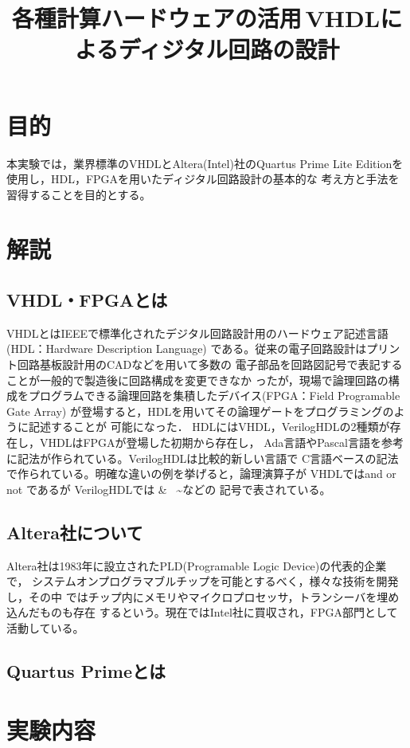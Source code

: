 \documentclass{ltjsarticle}
\title{各種計算ハードウェアの活用\,VHDLによるディジタル回路の設計}
\begin{document}
\maketitle

\section{目的}
本実験では，業界標準のVHDLとAltera(Intel)社のQuartus Prime Lite
Editionを使用し，HDL，FPGAを用いたディジタル回路設計の基本的な
考え方と手法を習得することを目的とする。
\section{解説}
	\subsection{VHDL・FPGAとは}
	VHDLとはIEEEで標準化されたデジタル回路設計用のハードウェア記述言語(HDL：Hardware Description Language)
	である。従来の電子回路設計はプリント回路基板設計用のCADなどを用いて多数の
	電子部品を回路図記号で表記することが一般的で製造後に回路構成を変更できなか
	ったが，現場で論理回路の構成をプログラムできる論理回路を集積したデバイス(FPGA：Field Programable Gate Array)
	が登場すると，HDLを用いてその論理ゲートをプログラミングのように記述することが
	可能になった．
	HDLにはVHDL，VerilogHDLの2種類が存在し，VHDLはFPGAが登場した初期から存在し，
	Ada言語やPascal言語を参考に記法が作られている。VerilogHDLは比較的新しい言語で
	C言語ベースの記法で作られている。明確な違いの例を挙げると，論理演算子が
	VHDLではand or not であるが VerilogHDLでは \& \textbar \, \textasciitilde などの
	記号で表されている。
	
	\subsection{Altera社について}
	Altera社は1983年に設立されたPLD(Programable Logic Device)の代表的企業で，
	システムオンプログラマブルチップを可能とするべく，様々な技術を開発し，その中
	ではチップ内にメモリやマイクロプロセッサ，トランシーバを埋め込んだものも存在
	するという。現在ではIntel社に買収され，FPGA部門として活動している。
	\subsection{Quartus Primeとは}
	

\section{実験内容}
\end{document}
